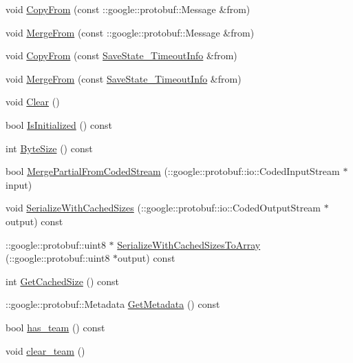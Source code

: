 \begin{DoxyCompactItemize}
\item 
void \hyperlink{class_save_state___timeout_info_a9209d1783cbc87ab5dcc607d9ca7a4af}{Copy\-From} (const \-::google\-::protobuf\-::\-Message \&from)
\item 
void \hyperlink{class_save_state___timeout_info_a457adb91d088b962e2e57aedff4afa7b}{Merge\-From} (const \-::google\-::protobuf\-::\-Message \&from)
\item 
void \hyperlink{class_save_state___timeout_info_a1c95517cb8e9bb6e3030a179ff951461}{Copy\-From} (const \hyperlink{class_save_state___timeout_info}{Save\-State\-\_\-\-Timeout\-Info} \&from)
\item 
void \hyperlink{class_save_state___timeout_info_ad9297f978d98901414681591b3f2ce23}{Merge\-From} (const \hyperlink{class_save_state___timeout_info}{Save\-State\-\_\-\-Timeout\-Info} \&from)
\item 
void \hyperlink{class_save_state___timeout_info_a7eb1031275093100b7bcccdecfdee893}{Clear} ()
\item 
bool \hyperlink{class_save_state___timeout_info_ae95f420a7afd487d6f42ebecd7b278f8}{Is\-Initialized} () const 
\item 
int \hyperlink{class_save_state___timeout_info_ab1dc0e0ab65f7f20ed08ac73d5f8f665}{Byte\-Size} () const 
\item 
bool \hyperlink{class_save_state___timeout_info_aa0f3b9b8219f2a3f8e67e8aa63fd106a}{Merge\-Partial\-From\-Coded\-Stream} (\-::google\-::protobuf\-::io\-::\-Coded\-Input\-Stream $\ast$input)
\item 
void \hyperlink{class_save_state___timeout_info_ad092329ea12704f4bfbeb50627e1c1d6}{Serialize\-With\-Cached\-Sizes} (\-::google\-::protobuf\-::io\-::\-Coded\-Output\-Stream $\ast$output) const 
\item 
\-::google\-::protobuf\-::uint8 $\ast$ \hyperlink{class_save_state___timeout_info_ac9c5184d772f11a9392c923dc116696d}{Serialize\-With\-Cached\-Sizes\-To\-Array} (\-::google\-::protobuf\-::uint8 $\ast$output) const 
\item 
int \hyperlink{class_save_state___timeout_info_a58e61eeb6c45145bee764f3d29e47544}{Get\-Cached\-Size} () const 
\item 
\-::google\-::protobuf\-::\-Metadata \hyperlink{class_save_state___timeout_info_a780afcc0d3a8e3137b7a3132525b501c}{Get\-Metadata} () const 
\item 
bool \hyperlink{class_save_state___timeout_info_a41dcd38c72363a1de137066045d725a7}{has\-\_\-team} () const 
\item 
void \hyperlink{class_save_state___timeout_info_af85d1f17dd6f0157501dc2501a53ed1d}{clear\-\_\-team} ()

\end{DoxyCompactItemize}
